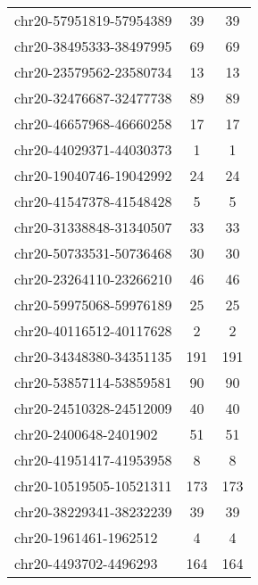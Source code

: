 \begin{longtable}{lSS}
	chr20-57951819-57954389 & 39     & 39                                        \\
	chr20-38495333-38497995 & 69     & 69                                        \\
	chr20-23579562-23580734 & 13     & 13                                        \\
	chr20-32476687-32477738 & 89     & 89                                        \\
	chr20-46657968-46660258 & 17     & 17                                        \\
	chr20-44029371-44030373 & 1      & 1                                         \\
	chr20-19040746-19042992 & 24     & 24                                        \\
	chr20-41547378-41548428 & 5      & 5                                         \\
	chr20-31338848-31340507 & 33     & 33                                        \\
	chr20-50733531-50736468 & 30     & 30                                        \\
	chr20-23264110-23266210 & 46     & 46                                        \\
	chr20-59975068-59976189 & 25     & 25                                        \\
	chr20-40116512-40117628 & 2      & 2                                         \\
	chr20-34348380-34351135 & 191    & 191                                       \\
	chr20-53857114-53859581 & 90     & 90                                        \\
	chr20-24510328-24512009 & 40     & 40                                        \\
	chr20-2400648-2401902   & 51     & 51                                        \\
	chr20-41951417-41953958 & 8      & 8                                         \\
	chr20-10519505-10521311 & 173    & 173                                       \\
	chr20-38229341-38232239 & 39     & 39                                        \\
	chr20-1961461-1962512   & 4      & 4                                         \\
	chr20-4493702-4496293   & 164    & 164                                       \\

\end{longtable}
